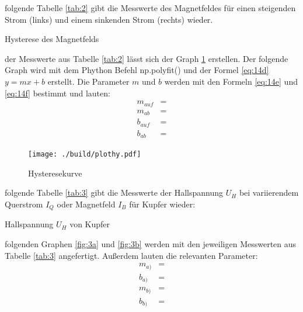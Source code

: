 \justifying folgende Tabelle \ref{tab:2} gibt die Messwerte des Magnetfeldes für einen steigenden Strom (links) und einem 
sinkenden Strom (rechts) wieder. 

\begin{table}[H]
    \centering
    
    \caption{Hysterese des Magnetfelds}
    \label{tab:2}
\end{table}

\justifying der Messwerte aus Tabelle \ref{tab:2} lässt sich der Graph \ref{fig:2} erstellen. Der folgende Graph wird 
mit dem Phython Befehl np.polyfit() \cite{numpy} und der Formel \eqref{eq:14d} $y = mx + b$ erstellt. Die Parameter $m$ und $b$ werden mit 
den Formeln \eqref{eq:14e} und \eqref{eq:14f} bestimmt und lauten:
\begin{subequations}
\begin{align}
    m_{auf} &= \text{} \label{eq:16a}\\
    m_{ab}  &= \text{}  \label{eq:16b}\\
    b_{auf} &= \text{} \label{eq:16c}\\
    b_{ab}  &= \text{}  \label{eq:16d}
\end{align}
\end{subequations}

\begin{figure}[H]
\centering
\texttt{[image: ./build/plothy.pdf]}
\caption{Hysteresekurve}
\label{fig:2}
\end{figure}


\justifying folgende Tabelle \ref{tab:3} gibt die Messwerte der Hallspannung $U_H$ bei variierendem Querstrom $I_Q$ oder Magnetfeld
$I_B$ für Kupfer wieder:

\begin{table}[H]
    \centering
    
    \caption{Hallspannung $U_H$ von Kupfer}
    \label{tab:3}
\end{table}

\justifying folgenden Graphen \ref{fig:3a} und \ref{fig:3b} werden mit den jeweiligen Messwerten aus Tabelle \ref{tab:3} 
angefertigt. Außerdem lauten die relevanten Parameter: 
\begin{subequations} \label{eq:17}
\begin{align}
    m_{a)} &= \text{} \label{eq:17a}\\
    b_{a)} &= \text{} \label{eq:17b}\\
    m_{b)} &= \text{} \label{eq:17c}\\
    b_{b)} &= \text{} \label{eq:17d}
\end{align}
\end{subequations}

